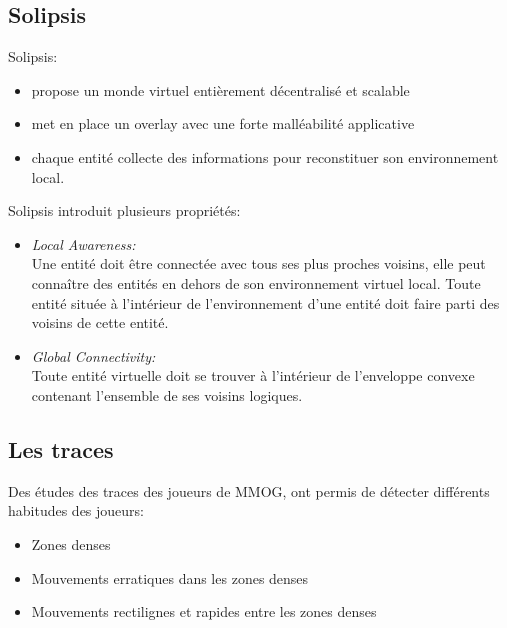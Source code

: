 \documentclass{beamer}
\begin{document}
  \subsection{Solipsis}

  \begin{frame}
	Solipsis:\\
	\begin{itemize}
		\item propose un monde virtuel entièrement décentralisé et scalable\\
		\item met en place un overlay avec une forte malléabilité applicative\\
		\item chaque entité collecte des informations pour reconstituer son environnement local.\\
	\end{itemize}
  \end{frame}

  \begin{frame}
	Solipsis introduit plusieurs propriétés:
	\begin{itemize}
                \item \textit{Local Awareness:}\\
                Une entité doit être connectée avec tous ses plus proches voisins, elle peut connaître des entités en dehors de son environnement virtuel local. Toute entité située à l'intérieur de l'environnement d'une entité doit faire parti des voisins de cette entité.
                \item \textit{Global Connectivity:}\\
                Toute entité virtuelle doit se trouver à l'intérieur de l'enveloppe convexe contenant l'ensemble de ses voisins logiques. \\
	\end{itemize}
  \end{frame}

  \subsection{Les traces}
  \begin{frame}
	Des études des traces des joueurs de MMOG, ont permis de détecter différents habitudes des joueurs:
	\begin{itemize}
		\item Zones denses 
		\item Mouvements erratiques dans les zones denses
		\item Mouvements rectilignes et rapides entre les zones denses
	\end{itemize}
  \end{frame}
\end{document}
